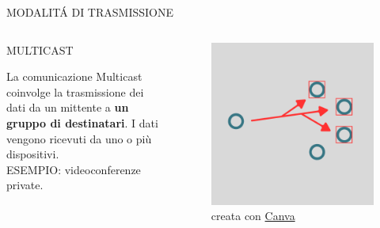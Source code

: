 \documentclass[aspectratio=1610]{beamer}
\begin{document}
\begin{frame}{MODALIT\'A DI TRASMISSIONE}
    \begin{columns}
        \begin{alertblock}{MULTICAST}
            \begin{minipage}{0.96\linewidth}
                \justifying
                La comunicazione Multicast coinvolge la trasmissione dei dati da un mittente a \textbf{un 
                gruppo di destinatari}. I dati vengono ricevuti da uno o più dispositivi.\\
                ESEMPIO: videoconferenze private.
            \end{minipage}
        \end{alertblock}
           \begin{figure}
               \includegraphics[width=\linewidth]{img/multicast.png}
               \caption{{creata con \href{https://www.canva.com}{Canva}}}
           \end{figure}
    \end{columns}
\end{frame}
\end{document}
